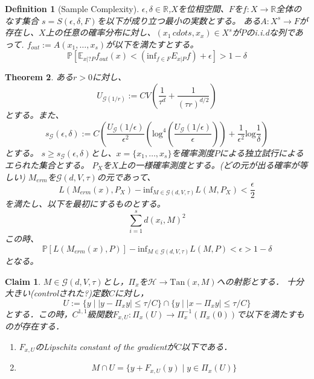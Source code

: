 \documentclass{ujarticle}
\newtheorem{thm}{Theorem}[section]
\newtheorem{dfn}[thm]{Definition}
\newtheorem{clm}{Claim}
\newcommand{\gdvt}{\mathcal{G}(d,V,\tau)}
\begin{document}
\begin{dfn}[Sample Complexity]
$\epsilon, \delta \in \mathbb{R}$,$X$を位相空間、$F$を$f:X \to \mathbb{R}$全体のなす集合
$s=S(\epsilon,\delta,F)$を以下が成り立つ最小の実数とする。
ある$A:X^s \to F$が存在し、$X$上の任意の確率分布に対し、$(x_1\,cdots ,x_x) \in X^s$が$P$のi.i.dな列であって.
$f_{out}:= A(x_1,\dots,x_s)$が以下を満たすとする。
\begin{equation*}
 \mathbb{P}[\mathbb{E}_{x|?P}f_{out}(x) < (\mathrm{inf}_{f \in F}E_{x|P}f) + \epsilon ] > 1 - \delta
\end{equation*}

\end{dfn}

\begin{thm}
 ある$r > 0$に対し、
 \begin{equation*}
  U_{\mathcal{G}(1/r)}:=CV( \frac{ 1 }{ \tau^d } + \frac{ 1 }{ (\tau r)^{d/2} } )
 \end{equation*}
 とする。また、
 \begin{equation*}
  s_{\mathcal{G}}(\epsilon,\delta):=C(\frac{ U_{\mathcal{G}}(1/\epsilon) }{ \epsilon^2 }(\mathrm{log}^4
  (\frac{U_{\mathcal{G}}(1/\epsilon)}{\epsilon})) + \frac{ 1 }{ \epsilon^2 }\mathrm{log}\frac{ 1 }{ \delta }  )
 \end{equation*}
とする。
$s \ge s_{\mathcal{G}}(\epsilon,\delta)$とし、$x=\{ x_1,\dots,x_s\}$を確率測度$P$による独立試行によるエられた集合とする。
$P_X$を$X$上の一様確率測度とする。(どの元が出る確率が等しい)
$M_{erm}$を$\mathcal{G}(d,V,\tau)$の元であって、
\begin{equation*}
 L(M_{erm}(x),P_X) - \mathrm{inf}_{M \in \mathcal{G}(d,V,\tau)} L(M,P_X) < \frac{ \epsilon }{ 2 }
\end{equation*}
を満たし、以下を最初にするものとする。
\begin{equation*}
 \sum_{i=1}^sd(x_i,M)^2
\end{equation*}
この時、
\begin{equation*}
 \mathbb{P}[L(M_{erm}(x),P)] - \mathrm{inf}_{M \in \mathcal{G}(d,V,\tau)} L(M,P) < \epsilon > 1- \delta
\end{equation*}
となる。
\end{thm}

\begin{clm}
  $M \in \gdvt$とし，$\Pi_x$を$\mathcal{H} \to \mathrm{Tan}(x,M)$への射影とする．
  十分大きい(controlされた?)定数$C$に対し，
  \begin{equation*}
   U:= \{ y \mid |y - \Pi_xy| \le \tau/C \} \cap \{ y \mid |x - \Pi_x y| \le \tau/C \}
  \end{equation*}
  とする．この時，$C^{1,1}$級関数$F_{x,U}:\Pi_x(U) \to \Pi_x^{-1}(\Pi_x(0))$で以下を満たすものが存在する．
  \begin{enumerate}
    \item $F_{x,U}$のLipschitz constant of the gradientが$C$以下である．
    \item \begin{equation*}
    M \cap U = \{ y + F_{x,U}(y) \mid y \in \Pi_x(U) \}
    \end{equation*}
  \end{enumerate}
\end{clm}
\end{document}
